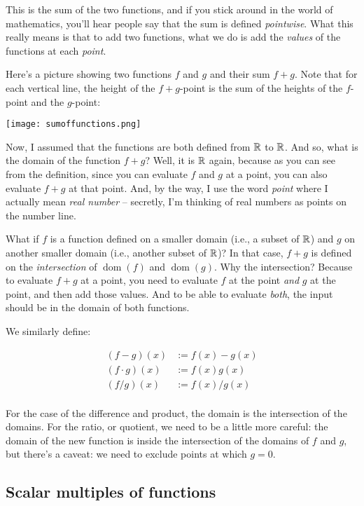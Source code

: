 \documentclass{amsart}
\begin{document}
This is the sum of the two functions, and if you stick around in the
world of mathematics, you'll hear people say that the sum is defined
{\em pointwise}. What this really means is that to add two functions,
what we do is add the {\em values} of the functions at each {\em
point}.

Here's a picture showing two functions $f$ and $g$ and their sum $f +
g$. Note that for each vertical line, the height of the $f + g$-point
is the sum of the heights of the $f$-point and the $g$-point:

\texttt{[image: sumoffunctions.png]}

Now, I assumed that the functions are both defined from $\mathbb{R}$ to
$\mathbb{R}$. And so, what is the domain of the function $f + g$? Well, it is
$\mathbb{R}$ again, because as you can see from the definition, since you can
evaluate $f$ and $g$ at a point, you can also evaluate $f + g$ at that
point. And, by the way, I use the word {\em point} where I actually
mean {\em real number} -- secretly, I'm thinking of real numbers as
points on the number line.

What if $f$ is a function defined on a smaller domain (i.e., a subset
of $\mathbb{R}$) and $g$ on another smaller domain (i.e., another subset of
$\mathbb{R}$)? In that case, $f + g$ is defined on the {\em intersection} of
$\operatorname{dom}(f)$ and $\operatorname{dom}(g)$. Why the
intersection? Because to evaluate $f + g$ at a point, you need to
evaluate $f$ at the point {\em and} $g$ at the point, and then add
those values. And to be able to evaluate {\em both}, the input should
be in the domain of both functions.

We similarly define:

\begin{align*}
  (f - g)(x) & := f(x) - g(x) \\
  (f \cdot g)(x) & := f(x)g(x) \\
  (f/g)(x) & := f(x)/g(x) \\
\end{align*}

For the case of the difference and product, the domain is the
intersection of the domains. For the ratio, or quotient, we need to be
a little more careful: the domain of the new function is inside the
intersection of the domains of $f$ and $g$, but there's a caveat: we
need to exclude points at which $g = 0$.

\subsection{Scalar multiples of functions}
\end{document}
